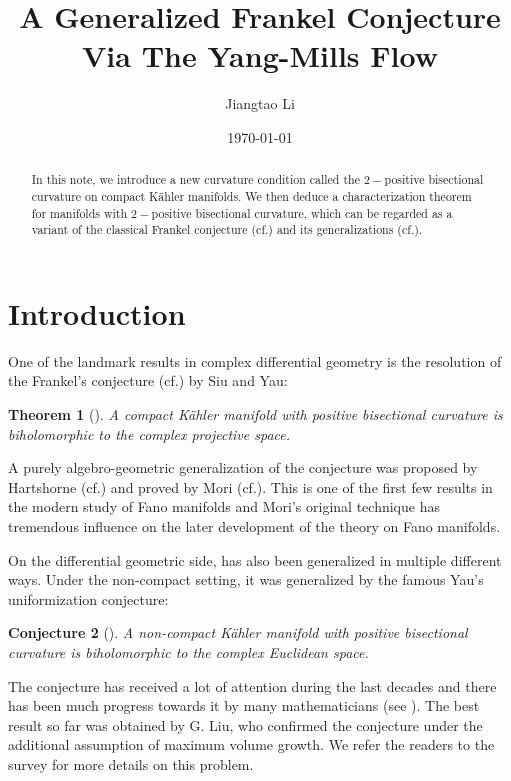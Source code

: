 \documentclass[11pt]{amsart}
\title{A Generalized Frankel Conjecture Via The Yang-Mills Flow}
\author[Jiangtao Li]{Jiangtao Li}
\date{\today}
\theoremstyle{plain}
\newtheorem{thm}{Theorem}[section]
\newtheorem{conj}[thm]{Conjecture}
\theoremstyle{definition}
\numberwithin{equation}{section}
\begin{document}
\maketitle

\begin{abstract}
    In this note, we introduce a new curvature condition called the $2-$positive bisectional curvature on compact K\"{a}hler manifolds. We then deduce a characterization theorem for manifolds with $2-$positive bisectional curvature, which can be regarded as a variant of the classical Frankel conjecture (cf.\cite{Fra61,SY80}) and its generalizations (cf.\cite{Siu80,Mok88}).
\end{abstract}

\tableofcontents

\section{Introduction}\label{Sec:Introduction}

One of the landmark results in complex differential geometry is the resolution of the Frankel's conjecture (cf.\cite{Fra61}) by Siu and Yau:
\begin{thm}[\cite{SY80}]\label{thm:FrankelConjecture}
    A compact K\"{a}hler manifold with positive bisectional curvature is biholomorphic to the complex projective space.
\end{thm}

A purely algebro-geometric generalization of the conjecture was proposed by Hartshorne (cf.\cite{Har70}) and proved by Mori (cf.\cite{Mor79}). This is one of the first few results in the modern study of Fano manifolds and Mori's original technique has tremendous influence on the later development of the theory on Fano manifolds.

On the differential geometric side,  has also been generalized in multiple different ways. Under the non-compact setting, it was generalized by the famous Yau's uniformization conjecture:
\begin{conj}[\cite{Yau88,SY94}]
    A non-compact K\"{a}hler manifold with positive bisectional curvature is biholomorphic to the complex Euclidean space.
\end{conj}
\noindent The conjecture has received a lot of attention during the last decades and there has been much progress towards it by many mathematicians (see \cite{Ni98,NT03,Ni04,CFYZ06,Liu16}). The best result so far was obtained by G. Liu, who confirmed the conjecture under the additional assumption of maximum volume growth. We refer the readers to the survey \cite{Liu20} for more details on this problem.
\end{document}
